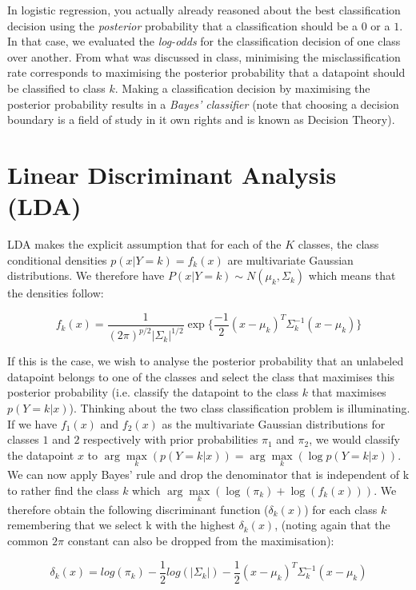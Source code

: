 \documentclass{article}
\begin{document}
In logistic regression, you actually already reasoned about the best classification decision using the \textit{posterior} probability that a classification should be a $0$ or a $1$. In that case, we evaluated the \textit{log-odds} for the classification decision of one class over another. From what was discussed in class, minimising the misclassification rate corresponds to maximising the posterior probability that a datapoint should be classified to class $k$. Making a classification decision by maximising the posterior probability results in a \textit{Bayes' classifier} (note that choosing a decision boundary is a field of study in it own rights and is known as Decision Theory).


\section{Linear Discriminant Analysis (LDA)}\label{sec:lda}
LDA makes the explicit assumption that for each of the $K$ classes, the class conditional densities $p(x|Y=k) = f_k(x)$ are multivariate Gaussian distributions. We therefore have $P(x|Y=k) \sim N(\mu_k, \Sigma_k)$ which means that the densities follow:

$$
f_k(x) = \frac{1}{(2\pi)^{p/2} \vert \Sigma_k \vert ^{1/2} } \exp \big \{\frac{-1}{2}(x - \mu_k)^T \Sigma_k^{-1} (x - \mu_k) \big \}
$$

If this is the case, we wish to analyse the posterior probability that an unlabeled datapoint belongs to one of the classes and select the class that maximises this posterior probability (i.e. classify the datapoint to the class $k$ that maximises $p(Y=k \vert x)$). Thinking about the two class classification problem is illuminating. If we have $f_1(x)$ and $f_2(x)$ as the multivariate Gaussian distributions for classes $1$ and $2$ respectively with prior probabilities $\pi_1$ and $\pi_2$, we would classify the datapoint $x$ to $\arg\max\limits_k(p(Y=k \vert x)) = \arg\max\limits_k(\log p(Y=k \vert x))$. We can now apply Bayes' rule and drop the denominator that is independent of k to rather find the class $k$ which $\arg\max\limits_k(\log(\pi_k) + \log(f_k(x)))$. We therefore obtain the following discriminant function ($\delta_k(x)$) for each class $k$ remembering that we select k with the highest $\delta_k(x)$, (noting again that the common $2\pi$ constant can also be dropped from the maximisation):

$$
\delta_k(x) = log(\pi_k) - \frac{1}{2}log(\vert \Sigma_k \vert) - \frac{1}{2}(x - \mu_k)^T \Sigma_k^{-1} (x - \mu_k)
$$
\end{document}
